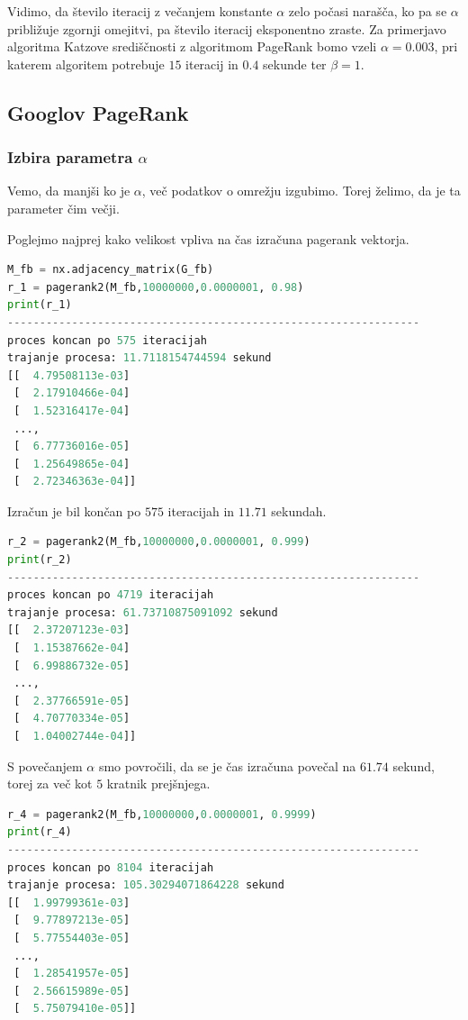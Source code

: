 \documentclass[12pt,a4paper]{amsart}
\begin{document}
Vidimo, da število iteracij z večanjem konstante $\alpha$ zelo počasi narašča, ko pa se $\alpha$ približuje zgornji omejitvi, pa število iteracij eksponentno zraste.
Za primerjavo algoritma Katzove središčnosti z algoritmom PageRank bomo vzeli $\alpha = 0.003$, pri katerem algoritem potrebuje $15$ iteracij in $0.4$ sekunde ter $\beta = 1.$
\pagebreak
\subsection{Googlov PageRank}
\subsubsection{Izbira parametra $\alpha$} 
Vemo, da manjši ko je $\alpha$, več podatkov o omrežju izgubimo. Torej želimo, da je ta parameter čim večji. 

Poglejmo najprej kako velikost vpliva na čas izračuna pagerank vektorja. 

\begin{lstlisting}[language=Python]
M_fb = nx.adjacency_matrix(G_fb)
r_1 = pagerank2(M_fb,10000000,0.0000001, 0.98)
print(r_1)
----------------------------------------------------------------
proces koncan po 575 iteracijah
trajanje procesa: 11.7118154744594 sekund
[[  4.79508113e-03]
 [  2.17910466e-04]
 [  1.52316417e-04]
 ..., 
 [  6.77736016e-05]
 [  1.25649865e-04]
 [  2.72346363e-04]]
\end{lstlisting}

Izračun je bil končan po $575$ iteracijah in $11.71$ sekundah.

\begin{lstlisting}[language=Python]
r_2 = pagerank2(M_fb,10000000,0.0000001, 0.999)
print(r_2)
----------------------------------------------------------------
proces koncan po 4719 iteracijah
trajanje procesa: 61.73710875091092 sekund
[[  2.37207123e-03]
 [  1.15387662e-04]
 [  6.99886732e-05]
 ..., 
 [  2.37766591e-05]
 [  4.70770334e-05]
 [  1.04002744e-04]]
\end{lstlisting}
S povečanjem $\alpha$ smo povročili, da se je čas izračuna povečal na $61.74$ sekund, torej za več kot $5$ kratnik prejšnjega. 

\begin{lstlisting}[language=Python]
r_4 = pagerank2(M_fb,10000000,0.0000001, 0.9999)
print(r_4)
----------------------------------------------------------------
proces koncan po 8104 iteracijah
trajanje procesa: 105.30294071864228 sekund
[[  1.99799361e-03]
 [  9.77897213e-05]
 [  5.77554403e-05]
 ..., 
 [  1.28541957e-05]
 [  2.56615989e-05]
 [  5.75079410e-05]]
\end{lstlisting}
\end{document}
